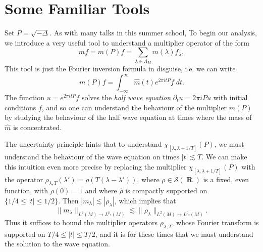 \documentclass{article}
\DeclareMathOperator{\RR}{\mathbf{R}}
\theoremstyle{plain}
\theoremstyle{remark}
\theoremstyle{definition}
\begin{document}




\section{Some Familiar Tools}

Set $P = \sqrt{-\Delta}$. As with many talks in this summer school, To begin our analysis, we introduce a very useful tool to understand a multiplier operator of the form
%
\[ m f = m \left( P \right) f = \sum_{\lambda \in \Lambda_M} m(\lambda) f_\lambda, \]
%
This tool is just the Fourier inversion formula in disguise, i.e. we can write
%
\[ m \left( P \right) f = \int_{-\infty}^\infty \widehat{m}(t) e^{2 \pi i t P} f\; dt. \]
%
The function $u = e^{2 \pi i t P} f$ solves the \emph{half wave equation} $\partial_t u = 2 \pi i P u$ with initial conditions $f$, and so one can understand the behaviour of the multiplier $m(P)$ by studying the behaviour of the half wave equation at times where the mass of $\widehat{m}$ is concentrated.

The uncertainty principle hints that to understand $\chi_{[\lambda,\lambda + 1/T]}(P)$, we must understand the behaviour of the wave equation on times $|t| \lesssim T$. We can make this intuition even more precise by replacing the multiplier $\chi_{[\lambda,\lambda + 1/T]}(P)$ with the operator $\rho_{\lambda,T}(\lambda') = \rho(T(\lambda - \lambda'))$, where $\rho \in \mathcal{S}(\RR)$ is a fixed, even function, with $\rho(0) = 1$ and where $\widehat{\rho}$ is compactly supported on $\{ 1/4 \leq |t| \leq 1/2 \}$. Then $|m_\lambda| \lesssim |\rho_\lambda|$, which implies that
%
\[ \| m_\lambda \|_{L^2(M) \to L^{p_c}(M)} \lesssim \| \rho_\lambda \|_{L^2(M) \to L^{p_c}(M)}. \]
%
Thus it suffices to bound the multiplier operators $\rho_{\lambda,T}$, whose Fourier transform is supported on $T/4 \leq |t| \leq T/2$, and it is for these times that we must understand the solution to the wave equation.
\end{document}
